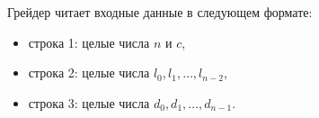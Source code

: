 Грейдер читает входные данные в следующем формате:

\begin{itemize}
\item строка 1: целые числа $n$ и $c$,
\item строка 2: целые числа $l_0, l_1, \ldots, l_{n - 2}$,
\item строка 3: целые числа $d_0, d_1, \ldots, d_{n - 1}$.
\end{itemize}